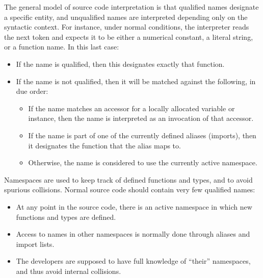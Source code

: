 The general model of source code interpretation is that qualified names
designate a specific entity, and unqualified names are interpreted
depending only on the syntactic context. For instance, under normal
conditions, the interpreter reads the next token and expects it to be
either a numerical constant, a literal string, or a function name. In
this last case:
\begin{itemize}

    \item If the name is qualified, then this designates exactly that
    function.

    \item If the name is not qualified, then it will be matched against
    the following, in due order:
    \begin{itemize}

        \item If the name matches an accessor for a locally allocated
        variable or instance, then the name is interpreted as an
        invocation of that accessor.

        \item If the name is part of one of the currently defined aliases
        (imports), then it designates the function that the alias maps
        to.

        \item Otherwise, the name is considered to use the currently
        active namespace.

    \end{itemize}

\end{itemize}

Namespaces are used to keep track of defined functions and types, and to
avoid spurious collisions. Normal source code should contain very few
qualified names:
\begin{itemize}

    \item At any point in the source code, there is an active namespace
    in which new functions and types are defined.

    \item Access to names in other namespaces is normally done through
    aliases and import lists.

    \item The developers are supposed to have full knowledge of ``their''
    namespaces, and thus avoid internal collisions.

\end{itemize}

